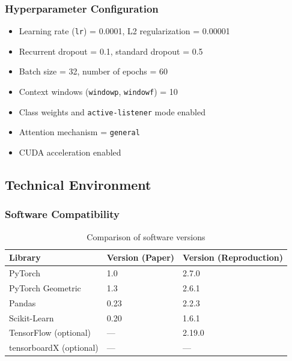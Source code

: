 \documentclass[a4paper,11pt]{article}
\begin{document}
\subsubsection{Hyperparameter Configuration}
\begin{itemize}
  \item Learning rate (\texttt{lr}) = 0.0001, L2 regularization = 0.00001
  \item Recurrent dropout = 0.1, standard dropout = 0.5
  \item Batch size = 32, number of epochs = 60
  \item Context windows (\texttt{windowp}, \texttt{windowf}) = 10
  \item Class weights and \texttt{active-listener} mode enabled
  \item Attention mechanism = \texttt{general}
  \item CUDA acceleration enabled
\end{itemize}

\subsection{Technical Environment}

\subsubsection{Software Compatibility}
\begin{table}[h]
  \centering
  \begin{tabular}{lll}
    \toprule
    \textbf{Library} & \textbf{Version (Paper)} & \textbf{Version (Reproduction)} \\
    \midrule
    PyTorch & 1.0 & 2.7.0 \\
    PyTorch Geometric & 1.3 & 2.6.1 \\
    Pandas & 0.23 & 2.2.3 \\
    Scikit-Learn & 0.20 & 1.6.1 \\
    TensorFlow (optional) & — & 2.19.0 \\
    tensorboardX (optional) & — & — \\
    \bottomrule
  \end{tabular}
  \caption{Comparison of software versions}
  \label{tab:env_versions}
\end{table}
\end{document}
